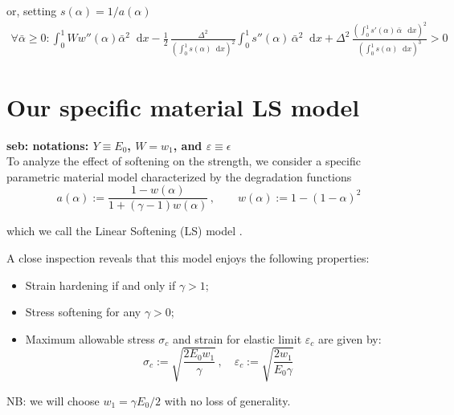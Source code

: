 \documentclass[final,3p,times,authoryear]{elsarticle}
\newcommand{\seb}[1]{{\bf\color{blue} seb: #1 }} %
\renewcommand*\d{\mathop{}\!\mathrm{d}} %
\begin{document}
or, setting $s(\alpha)=1/a(\alpha)$
\begin{align}
\label{eq:second_varia}
\forall \bar{\alpha} \ge0: \int_0^1 W w''(\alpha) \bar{\alpha}^2 \d x -
 \frac12  \, \frac{\Delta^2}{\left( \int_0^1 s(\alpha) \d x \right)^2}
\int_0^1 s''(\alpha) \, \bar{\alpha}^2 \d x
+
\Delta^2 \, \frac{\left( \int_0^1 s'(\alpha) \, \bar{\alpha} \, \d x \right)^2 }{\left( \int_0^1 s(\alpha) \d x \right)^3}
>0
\end{align}





\section{Our specific material LS model}
\seb{notations: $Y \equiv  E_0$, $W=w_1$, and $\varepsilon \equiv \epsilon$} \\
To analyze the effect of softening on the strength, we consider a specific parametric material model characterized by the degradation functions
\begin{equation}
        a(\alpha) := \frac{1-w(\alpha)}{1 + \left(\gamma-1\right)w(\alpha)} \, ,
        \qquad
        w(\alpha) := 1 - (1-\alpha)^2
    \label{eq:ATK_model}
\end{equation}

which we call the Linear Softening (LS) model \citep{Le2018Strain-gradient}.

A close inspection reveals that this model enjoys the following properties:
\begin{itemize}
    \item Strain hardening if and only if $\gamma>1$; 
    \item Stress softening for any $\gamma>0$;
    \item Maximum allowable stress $\sigma_c$ and strain for elastic limit $\varepsilon_c$ are given by:
\begin{equation}
\sigma_c:=\sqrt{\dfrac{2E_0 w_1 }{\gamma}}
\, , \quad
\varepsilon_c:=\sqrt{\dfrac{2 w_1 }{E_0 \gamma}}
\label{eq:criticalstress}
\end{equation}
\end{itemize}
NB: we will choose $w_1 = \gamma E_0 / 2$ with no loss of generality.
%
%
%
\end{document}
